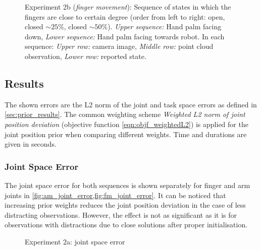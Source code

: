 \begin{figure}
\begin{tabular}{cc:c:c}
\end{tabular}
\caption[Finger movement sequence]{Experiment 2b (\textit{finger movement}): Sequence of states in which the fingers are close to certain degree (order from left to right: open, closed $\sim 25\%$, closed $\sim 50\%$). \textit{Upper sequence:} Hand palm facing down, \textit{Lower sequence:} Hand palm facing towards robot. In each sequence: \textit{Upper row:} camera image, \textit{Middle row:} point cloud observation, \textit{Lower row:} reported state.}
\label{fig:finger_movement_states}
\end{figure}



\subsection{Results}

The shown errors are the L2 norm of the joint and task space errors as defined in \cref{sec:prior_results}. The common weighting scheme \emph{Weighted L2 norm of joint position deviation} (objective function \cref{eqn:objf_weightedL2}) is applied for the joint position prior when comparing different weights. Time and durations are given in seconds.

\subsubsection{Joint Space Error}

The joint space error for both sequences is shown separately for finger and arm joints in \cref{fig:am_joint_error,fig:fm_joint_error}. It can be noticed that increasing prior weights reduces the joint position deviation in the case of less distracting observations. However, the effect is not as significant as it is for observations with distractions due to close solutions after proper initialisation.

\begin{figure}[h]
\centering
{}
\caption{Experiment 2a: joint space error}
\label{fig:am_joint_error}
\end{figure}


